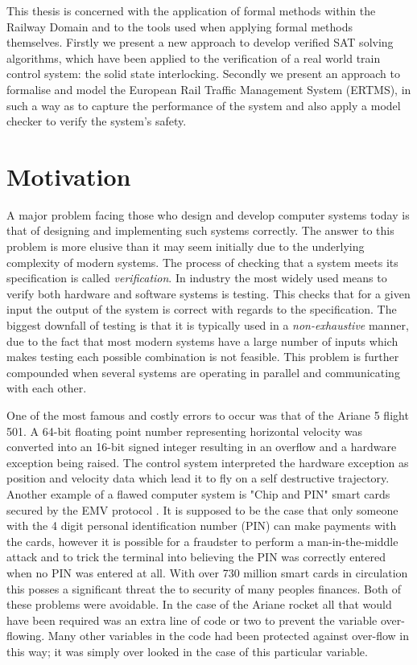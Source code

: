 
This thesis is concerned with the application of formal methods within the Railway Domain and to the tools used when applying formal methods themselves. Firstly we present a new approach to develop verified SAT solving algorithms, which have been applied to the verification of a real world train control system: the solid state interlocking. Secondly we present an approach to formalise and model the European Rail Traffic Management System (ERTMS), in such a way as to capture the performance of the system and also apply a model checker to verify the system's safety.

\section{Motivation}

A major problem facing those who design and develop computer systems today is  that of designing and implementing such systems correctly. The answer to this problem is more elusive than it may seem initially due to the underlying complexity of modern systems. The process of checking that a system meets its specification is called \emph{verification}. In industry the most widely used means to verify both hardware and software systems is testing. This checks that for a given input the output of the system is correct with regards to the specification. The biggest downfall of testing is that it is typically used in a \emph{non-exhaustive} manner, due to the fact that most modern systems have a large number of inputs which makes testing each possible combination is not feasible. This problem is further compounded when several systems are operating in parallel and communicating with each other.

One of the most famous and costly errors to occur was that of the Ariane 5 flight 501\cite{GL97}. A 64-bit floating point number representing horizontal velocity was converted into an 16-bit signed integer resulting in an overflow and a hardware exception being raised. The control system interpreted the hardware exception as position and velocity data which lead it to fly on a self destructive trajectory. Another example of a flawed computer system is "Chip and PIN" smart cards secured by the EMV protocol \cite{JM10}. It is supposed to be the case that only someone with the 4 digit personal identification number (PIN) can make payments with the cards, however it is possible for a fraudster to perform a man-in-the-middle attack and to trick the terminal into believing the PIN was correctly entered when no PIN was entered at all. With over 730 million smart cards in circulation this posses a significant threat the to security of many peoples finances. Both of these problems were avoidable. In the case of the Ariane rocket all that would have been required was an extra line of code or two to prevent the variable over-flowing. Many other variables in the code had been protected against over-flow in this way; it was simply over looked in the case of this particular variable.


